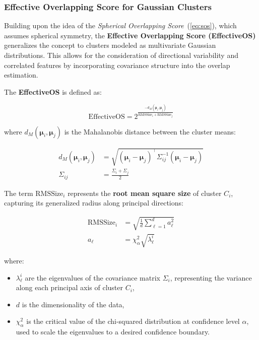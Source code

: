 \subsubsection*{Effective Overlapping Score for Gaussian Clusters}

Building upon the idea of the \emph{Spherical Overlapping
      Score}~(\ref{eq:sos}), which assumes spherical symmetry, the \textbf{Effective
      Overlapping Score (EffectiveOS)} generalizes the concept to clusters modeled as
multivariate Gaussian distributions. This allows for the consideration of
directional variability and correlated features by incorporating covariance
structure into the overlap estimation.

The \textbf{EffectiveOS} is defined as:

\begin{equation}
      \text{EffectiveOS} = 2^{\frac{-d_M(\boldsymbol{\mu}_i, \boldsymbol{\mu}_j)}{\text{RMSSize}_i + \text{RMSSize}_j}}
\end{equation}

where $ d_M(\boldsymbol{\mu}_i, \boldsymbol{\mu}_j) $ is the Mahalanobis distance between the cluster
means:

\begin{align}
      d_M(\boldsymbol{\mu}_i, \boldsymbol{\mu}_j) & = \sqrt{(\boldsymbol{\mu}_i - \boldsymbol{\mu}_j)^\top \Sigma_{ij}^{-1} (\boldsymbol{\mu}_i - \boldsymbol{\mu}_j)} \\
      \Sigma_{ij}       & = \frac{\Sigma_i + \Sigma_j}{2}
\end{align}

The term $ \text{RMSSize}_i $ represents the \textbf{root mean square size} of
cluster $ C_i $, capturing its generalized radius along principal directions:

\begin{align}
      \text{RMSSize}_i & = \sqrt{\frac{1}{d} \sum_{\ell=1}^d a_\ell^2} \\
      a_\ell           & = \chi^2_\alpha \sqrt{\lambda_\ell^i}
\end{align}

where:
\begin{itemize}
      \item $ \lambda_\ell^i $ are the eigenvalues of the covariance matrix $ \Sigma_i $,
            representing the variance along each principal axis of cluster $ C_i $,
      \item $ d $ is the dimensionality of the data,
      \item $ \chi^2_\alpha $ is the critical value of the chi-squared distribution at
            confidence level $ \alpha $, used to scale the eigenvalues to a desired confidence boundary.
\end{itemize}

